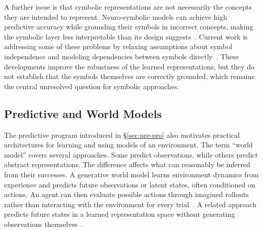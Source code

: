 \documentclass[acmsmall,screen,review,anonymous]{acmart}
\begin{document}
A further issue is that symbolic representations are not necessarily the concepts they are intended to represent.
%
Neuro-symbolic models can achieve high predictive accuracy while grounding their symbols in incorrect concepts, making the symbolic layer less interpretable than its design suggests~\citep{NEURIPS2023_e560202b}.
%
Current work is addressing some of these problems by relaxing assumptions about symbol independence and modeling dependencies between symbols directly~\citep{pmlr-v235-van-krieken24a, krieken2025neurosymbolic}. 
%
These developments improve the robustness of the learned representations, but they do not establish that the symbols themselves are correctly grounded, which remains the central unresolved question for symbolic approaches.



\subsection{Predictive and World Models} 
\label{subsec:world-model}
The predictive program introduced in \S\ref{sec:pre-pro} also motivates practical architectures for learning and using models of an environment.
%
The term ``world model'' covers several approaches.
%
Some predict observations, while others predict abstract representations.
%
The difference affects what can reasonably be inferred from their successes.
%
A generative world model learns environment dynamics from experience and predicts future observations or latent states, often conditioned on actions.
%
An agent can then evaluate possible actions through imagined rollouts rather than interacting with the environment for every trial~\citep{ha2018recurrentworld, hafner2020dreamcontrollearningbehaviors}.
%
A related approach predicts future states in a learned representation space without generating observations themselves~\citep{lecun2022, matsuo2022worldmodel}.
\end{document}
